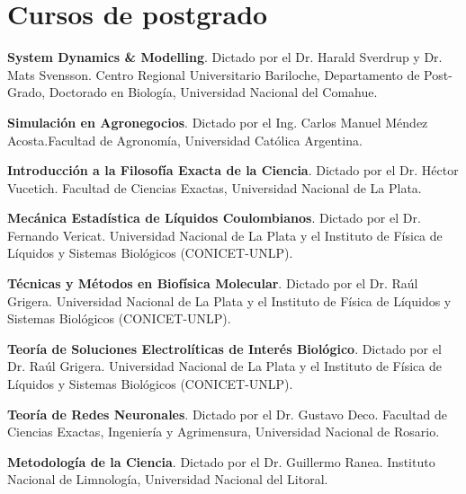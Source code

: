 \section{Cursos de postgrado}
\begin{timeline}
 \textbf{System Dynamics \& Modelling}. Dictado por el Dr. Harald Sverdrup y Dr. Mats Svensson. Centro Regional Universitario Bariloche, Departamento de Post-Grado, Doctorado en Biología, Universidad Nacional del Comahue.
 
  \textbf{Simulación en Agronegocios}. Dictado por el Ing. Carlos Manuel Méndez Acosta.Facultad de Agronomía, Universidad Católica Argentina.
 
 \textbf{Introducción a la Filosofía Exacta de la Ciencia}. Dictado por el Dr. Héctor Vucetich. Facultad de Ciencias Exactas, Universidad Nacional de La Plata.
 
 \textbf{Mecánica Estadística de Líquidos Coulombianos}. Dictado por el Dr. Fernando Vericat. Universidad Nacional de La Plata  y el Instituto de Física de Líquidos y  Sistemas Biológicos (CONICET-UNLP).
 
 \textbf{Técnicas y Métodos en Biofísica Molecular}. Dictado por el Dr. Raúl Grigera. Universidad Nacional de La Plata  y el Instituto de Física de Líquidos y Sistemas Biológicos (CONICET-UNLP).
 
 \textbf{Teoría de Soluciones Electrolíticas de Interés Biológico}. Dictado por el Dr. Raúl Grigera. Universidad Nacional de La Plata  y el Instituto de Física de Líquidos y Sistemas Biológicos (CONICET-UNLP). 
 
 \textbf{Teoría de Redes Neuronales}. Dictado por el Dr. Gustavo Deco. Facultad de Ciencias Exactas, Ingeniería y Agrimensura, Universidad Nacional de Rosario.
 
 \textbf{Metodología de la Ciencia}. Dictado por el Dr. Guillermo Ranea. Instituto Nacional de Limnología, Universidad Nacional del Litoral.
\end{timeline}